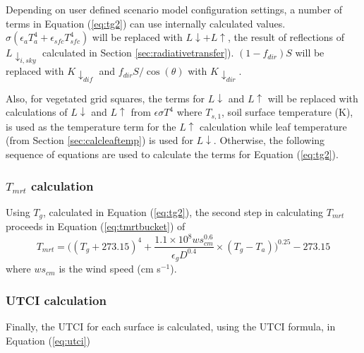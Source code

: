 \documentclass[final,3p,times,authoryear]{elsarticle}
\begin{document}
Depending on user defined scenario model configuration settings, a number of terms in Equation (\ref{eq:tg2}) can use internally calculated values. $\sigma(\epsilon_{a} T_{a}^{4} + \epsilon_{sfc} T_{sfc}^{4} )$ will be replaced with $L\downarrow + L\uparrow$, the result of reflections of $L \downarrow_{i,sky}$ calculated in Section \ref{sec:radiativetransfer}). $(1-f_{dir})S$ will be replaced with $K \downarrow_{dif}$ and $f_{dir}S/ \cos(\theta)$ with $K \downarrow_{dir}$. 




Also, for vegetated grid squares, the terms for $L\downarrow$ and $L\uparrow$ will be replaced with calculations of $L\downarrow$ and $L\uparrow$ from $\epsilon \sigma T^{4}$ where $T_{s,1}$, soil surface temperature (K), is used as the temperature term for the $L\uparrow$ calculation while leaf temperature (from Section \ref{sec:calcleaftemp}) is used for $L\downarrow$. Otherwise, the following sequence of equations are used to calculate the terms for Equation (\ref{eq:tg2}).




\subsubsection{$T_{mrt}$ calculation}




Using $T_{g}$, calculated in Equation (\ref{eq:tg2}), the second step in calculating $T_{mrt}$ proceeds in Equation (\ref{eq:tmrtbucket}) of \cite{Kantor2011}
\begin{equation}\label{eq:tmrtbucket}
  T_{mrt} = 
  \bigg(
   (T_{g}+273.15)^{4} + 
    \frac{1.1 \times 10^{8}  ws_{cm}^{0.6}}{\epsilon_{g}  D^{0.4}}
    \times 
     (T_{g}-T_{a})
    \bigg)^{0.25} - 273.15
\end{equation}
 where $ws_{cm}$ is the wind speed (cm s$^{-1}$).


\subsubsection{UTCI calculation}
Finally, the UTCI for each surface is calculated, using the \cite{Brode2009u} UTCI formula, in Equation (\ref{eq:utci})
\end{document}

